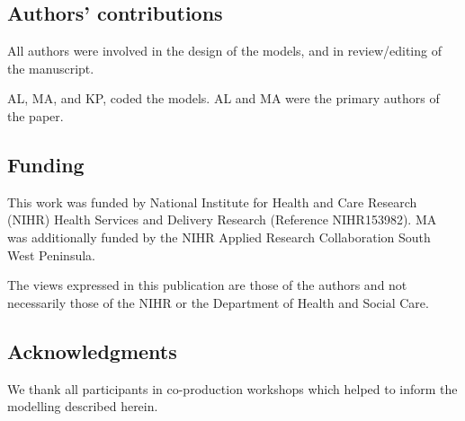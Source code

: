 \subsection{Authors' contributions}

All authors were involved in the design of the models, and in review/editing of the manuscript.

AL, MA, and KP, coded the models. AL and MA were the primary authors of the paper.


\subsection*{Funding}

This work was funded by National Institute for Health and Care Research (NIHR) Health Services and Delivery Research (Reference NIHR153982). MA was additionally funded by the NIHR Applied Research Collaboration South West Peninsula.

The views expressed in this publication are those of the authors and not necessarily those
of the NIHR or the Department of Health and Social Care.

\subsection*{Acknowledgments}

We thank all participants in co-production workshops which helped to inform the modelling described herein.

